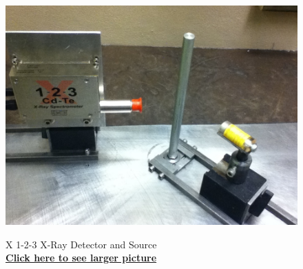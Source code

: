 \documentclass{../lab}
\begin{document}
\begin{figure}[H]
\begin{minipage}{.49\linewidth}
    \href{http://experimentationlab.berkeley.edu/sites/default/files/images/COM_3.JPG}{\includegraphics[width=\linewidth,keepaspectratio]{images/COM_3.JPG}} \\
    \caption{X 1-2-3 X-Ray Detector and Source \\ \href{http://experimentationlab.berkeley.edu/sites/default/files/images/COM_3.JPG}{\textbf{Click here to see larger picture}}}
\end{minipage} 
\end{figure}
\end{document}
